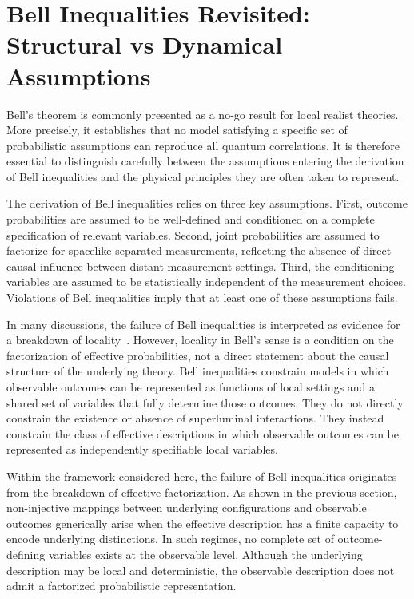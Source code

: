 \section{Bell Inequalities Revisited: Structural vs Dynamical Assumptions}
  \label{sec:abstract-math-model}

  Bell’s theorem is commonly presented as a no-go result for local realist theories.
  More precisely, it establishes that no model satisfying a specific set of probabilistic
  assumptions can reproduce all quantum correlations.
  It is therefore essential to distinguish carefully between the assumptions entering
  the derivation of Bell inequalities and the physical principles they are often taken to represent.

  The derivation of Bell inequalities relies on three key assumptions.
  First, outcome probabilities are assumed to be well-defined and conditioned on a
  complete specification of relevant variables.
  Second, joint probabilities are assumed to factorize for spacelike separated
  measurements, reflecting the absence of direct causal influence between distant measurement settings.
  Third, the conditioning variables are assumed to be statistically independent of the measurement choices.
  Violations of Bell inequalities imply that at least one of these assumptions fails.

  In many discussions, the failure of Bell inequalities is interpreted as evidence for a breakdown of
  locality~\cite{Bell1964}.
  However, locality in Bell’s sense is a condition on the factorization of effective
  probabilities, not a direct statement about the causal structure of the underlying
  theory.
  Bell inequalities constrain models in which observable outcomes can be represented
  as functions of local settings and a shared set of variables that fully determine
  those outcomes.
  They do not directly constrain the existence or absence of superluminal interactions.
  They instead constrain the class of effective descriptions in which observable outcomes
  can be represented as independently specifiable local variables.

  Within the framework considered here, the failure of Bell inequalities originates
  from the breakdown of effective factorization.
  As shown in the previous section, non-injective mappings between underlying
  configurations and observable outcomes generically arise when the effective
  description has a finite capacity to encode underlying distinctions.
  In such regimes, no complete set of outcome-defining variables exists at the
  observable level.
  Although the underlying description may be local and deterministic, the observable
  description does not admit a factorized probabilistic representation.

